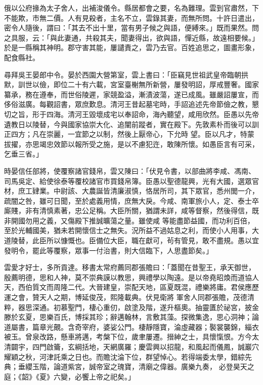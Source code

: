 \begin{pinyinscope}
 俄以公府掾為太子舍人，出補浚儀令。縣居都會之要，名為難理。雲到官肅然，下不能欺，市無二價。人有見殺者，主名不立，雲錄其妻，而無所問。十許日遣出，密令人隨後，謂曰：「其去不出十里，當有男子候之與語，便縛來。」既而果然。問之具服，云：「與此妻通，共殺其夫，聞妻得出，欲與語，憚近縣，故遠相要候。」於是一縣稱其神明。郡守害其能，屢譴責之，雲乃去官。百姓追思之，圖畫形象，
 配食縣社。



 尋拜吳王晏郎中令。晏於西園大營第室，雲上書曰：「臣竊見世祖武皇帝臨朝拱默，訓世以儉，即位二十有六載，宮室臺榭無所新營，屢發明詔，厚戒豐奢。國家纂承，務在遵奉，而世俗陵遲，家競盈溢，漸漬波蕩，遂已成風。雖嚴詔屢宣，而侈俗滋廣。每觀詔書，眾庶歎息。清河王昔起墓宅時，手詔追述先帝節儉之教，懇切之旨，形于四海。清河王毀壞成宅以奉詔命，海內聽望，咸用欣然。臣愚以先帝遺教日以陵替，今與國家協崇大化、追闡前蹤者，實在殿下。先敦素朴而後可以訓正四方；凡在崇麗，一宜節之以制，然後上厭帝心，下允時
 望。臣以凡才，特蒙拔擢，亦思竭忠效節以報所受之施，是以不慮犯迕，敢陳所懷。如愚臣言有可采，乞垂三省。」



 時晏信任部將，使覆察諸官錢帛，雲又陳曰：「伏見令書，以部曲將李咸、馮南、司馬吳定、給使徐泰等覆校諸官市買錢帛簿。臣愚以聖德龍興，光有大國，選眾官材，庶工肄業。中尉該、大農誕皆清廉淑慎，恪居所司，其下眾官，悉州閭一介，疏闇之咎，雖可日聞，至於處義用情，庶無大戾。今咸、南軍旅小人，定、泰士卒廝賤，非有清慎素著，忠公足稱。大臣所關，猶謂未詳，咸等督察，然後得信，既非開國勿用之義，又傷殿下推誠曠蕩之量。雖使咸
 等能盡節益國，而功利百倍，至於光輔國美，猶未若開懷信士之無失。況所益不過姑息之利，而使小人用事，大道陵替，此臣所以慷慨也。臣備位大臣，職在獻可，茍有管見，敢不盡規。愚以宜發明令，罷此等覆察，眾事一付治書，則大信臨下，人思盡節矣。」



 雲愛才好士，多所貢達。移書太常府薦同郡張贍曰：「蓋聞在昔聖王，承天御世，殷薦明德，思和人神，莫不崇典謨以教思，興禮學以陶遠。是以帝堯昭煥而道協人天，西伯質文而周隆二代。大晉建皇，崇配天地，區夏既混，禮樂將庸。君侯應歷運之會，贊天人之期，博延俊茂，熙隆載典。伏見衛將
 軍舍人同郡張贍，茂德清粹，器思深通。初慕聖門，棲心重仞，啟塗及階，遂升樞奧。抽靈匱於祕宮，披金滕於玄夏，思樂百氏，博採其珍；辭邁翰林，言敷其藻。探微集逸，思心洞神；論道屬書，篇章光覿。含奇宰府，婆娑公門。棲靜隱寶，淪虛藏器；褧裳襲錦，緇衣被玉。曾泉改路，懸車將邁，考槃下位，歲聿屢遷。搢紳之士，具懷愾恨。方今太清闢宇，四門啟籥，玄綱括地，天網廣羅；慶雲興以招龍，和風起而儀鳳，誠巖穴耀穎之秋，河津託乘之日也。而贍沈淪下位，群望悼心。若得端委太學，錯綜先典；垂纓玉階，論道紫宮，誠帝室之瑰寶，清廟之偉器。廣樂九奏，
 必登昊天之庭；《韶》《夏》六變，必饗上帝之祀矣。」




\end{pinyinscope}
